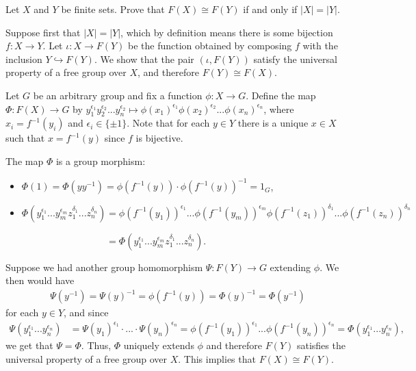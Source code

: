\begin{homework}[e]
	\prob Let $X$ and $Y$ be finite sets. Prove that $F(X) \cong F(Y)$ if and only if $|X|=|Y|$.
	\begin{prf}
		Suppose first that $|X| = |Y|$, which by definition means there is some bijection $f:X\to Y$. Let $\iota:X\to F(Y)$ be the function obtained by composing $f$ with the inclusion $Y \hookrightarrow F(Y)$. We show that the pair $(\iota, F(Y))$ satisfy the universal property of a free group over $X$, and therefore $F(Y) \cong F(X)$. 

		Let $G$ be an arbitrary group and fix a function $\phi:X\to G$. Define the map $\Phi:F(X)\to G$ by $y_1^{\epsilon_1}y_2^{\epsilon_2}...y_n^{\epsilon_2}\mapsto \phi(x_1)^{\epsilon_1}\phi(x_2)^{\epsilon_2}...\phi(x_n)^{\epsilon_n}$, where $x_i = f^{-1}(y_i)$ and $\epsilon_i \in \{\pm 1\}$. Note that for each $y \in Y$ there is a unique $x \in X$ such that $x = f^{-1}(y)$ since $f$ is bijective. 

		The map $\Phi$ is a group morphism:
		\begin{itemize}
			\item $\Phi(1) = \Phi(yy^{-1}) = \phi(f^{-1}(y))\cdot \phi(f^{-1}(y))^{-1} = 1_G$,
			\item $\Phi\left(y_1^{\epsilon_1}...y_m^{\epsilon_m}z_1^{\delta_1}...z_n^{\delta_n}\right) = \phi\left(f^{-1}(y_1)\right)^{\epsilon_1}...\phi\left(f^{-1}(y_m)\right)^{\epsilon_m}\phi\left(f^{-1}(z_1)\right)^{\delta_1}...\phi\left(f^{-1}(z_n)\right)^{\delta_n}$

				$\phantom{\Phi\left(y_1^{\epsilon_1}...y_m^{\epsilon_m}z_1^{\delta_1}...z_n^{\delta_n}\right)} = \Phi(y_1^{\epsilon_1}...y_m^{\epsilon_m}z_1^{\delta_1}...z_n^{\delta_n})$.	
		\end{itemize}

		Suppose we had another group homomorphism $\Psi:F(Y)\to G$ extending $\phi$. We then would have
		\begin{align*}
			\Psi(y^{-1}) = \Psi(y)^{-1} = \phi\left(f^{-1}(y)\right) = \Phi(y)^{-1} = \Phi(y^{-1})
		\end{align*}
		for each $y \in Y$, and since
		\begin{align*}
			\Psi\left(y_1^{\epsilon_1}...y_n^{\epsilon_n}\right) &= \Psi(y_1)^{\epsilon_1}\cdot ...\cdot \Psi(y_n)^{\epsilon_n} = \phi\left(f^{-1}(y_1)\right)^{\epsilon_1}...\phi\left(f^{-1}(y_n)\right)^{\epsilon_n} = \Phi\left(y_1^{\epsilon_1}...y_n^{\epsilon_n}\right),
		\end{align*}
		we get that $\Psi = \Phi$. Thus, $\Phi$ uniquely extends $\phi$ and therefore $F(Y)$ satisfies the universal property of a free group over $X$. This implies that $F(X) \cong F(Y)$. 


\end{prf}
\end{homework}
